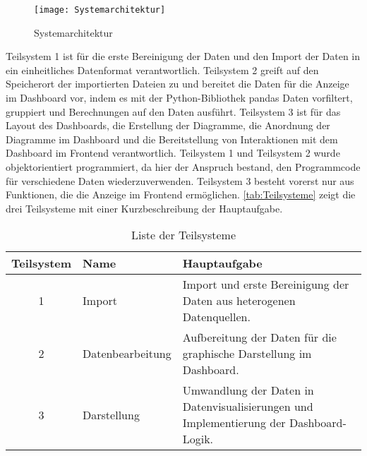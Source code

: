     \begin{figure}[H]
        \centering
            \texttt{[image: Systemarchitektur]}
            \caption{Systemarchitektur}
            \label{fig:Systemarchitektur}
    \end{figure}

    Teilsystem 1 ist für die erste Bereinigung der Daten und den Import der Daten in ein einheitliches Datenformat verantwortlich. 
    Teilsystem 2 greift auf den Speicherort der importierten Dateien zu und bereitet die Daten für die Anzeige im Dashboard vor, 
    indem es mit der Python-Bibliothek pandas Daten vorfiltert, gruppiert und Berechnungen auf den Daten ausführt. Teilsystem 3 ist für das Layout des Dashboards, 
    die Erstellung der Diagramme, die Anordnung der Diagramme im Dashboard und die Bereitstellung von Interaktionen mit dem Dashboard im Frontend
    verantwortlich. Teilsystem 1 und Teilsystem 2 wurde objektorientiert programmiert, da hier der Anspruch bestand, den Programmcode
    für verschiedene Daten wiederzuverwenden. Teilsystem 3 besteht vorerst nur aus Funktionen, die die Anzeige im Frontend ermöglichen.
    \autoref{tab:Teilsysteme} zeigt die drei Teilsysteme mit einer Kurzbeschreibung der Hauptaufgabe.

       \begingroup
            \setlength{\tabcolsep}{4pt} %
            \renewcommand{\arraystretch}{1.5}
            \begin{table}[h]
                \centering
                \begin{adjustbox}{max width=\textwidth}
                \Huge
                \begin{tabular}{cll}
                   \toprule
                   \textbf{Teilsystem}             & Name   &{Hauptaufgabe} \\
                   \midrule     
                            1                      &Import  &Import und erste Bereinigung der Daten aus heterogenen Datenquellen.\\
                            2                      &Datenbearbeitung     &Aufbereitung der Daten für die graphische Darstellung im Dashboard.\\
                            3                      &Darstellung          &Umwandlung der Daten in Datenvisualisierungen und Implementierung der Dashboard-Logik.\\

                    \bottomrule
                \end{tabular}
                \end{adjustbox}
                \caption{%
                    Liste der Teilsysteme
                \label{tab:Teilsysteme}
                }
                 \end{table}
            \endgroup

